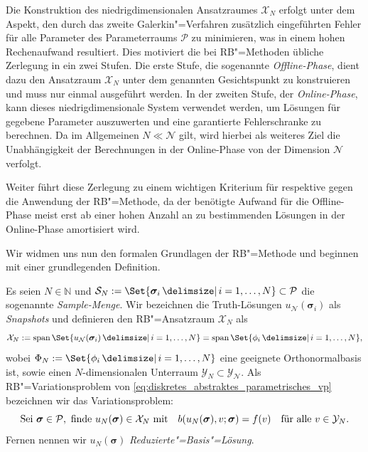 \documentclass[../main.tex]{subfiles}
\begin{document}
Die Konstruktion des niedrigdimensionalen Ansatzraumes $\mathcal X_{N}$ erfolgt unter dem Aspekt, den durch das zweite Galerkin"=Verfahren zusätzlich eingeführten Fehler für alle Parameter des Parameterraums $\mathcal P$ zu minimieren, was in einem hohen Rechenaufwand resultiert.
Dies motiviert die bei RB"=Methoden übliche Zerlegung in ein zwei Stufen.
Die erste Stufe, die sogenannte \emph{Offline-Phase}, dient dazu den Ansatzraum $\mathcal X_{N}$ unter dem genannten Gesichtspunkt zu konstruieren und muss nur einmal ausgeführt werden.
In der zweiten Stufe, der \emph{Online-Phase}, kann dieses niedrigdimensionale System verwendet werden, um Lösungen für gegebene Parameter auszuwerten und eine garantierte Fehlerschranke zu berechnen.
Da im Allgemeinen $N \ll \mathcal N$ gilt, wird hierbei als weiteres Ziel die Unabhängigkeit der Berechnungen in der Online-Phase von der Dimension $\mathcal N$ verfolgt.

Weiter führt diese Zerlegung zu einem wichtigen Kriterium für respektive gegen die Anwendung der RB"=Methode, da der benötigte Aufwand für die Offline-Phase meist erst ab einer hohen Anzahl an zu bestimmenden Lösungen in der Online-Phase amortisiert wird.

Wir widmen uns nun den formalen Grundlagen der RB"=Methode und beginnen mit einer grundlegenden Definition.

\begin{Definition}
\label{definition:rb_variationsproblem}
    Es seien $N \in \mathbb{N}$ und $\mathcal S_{N} := \Set{ \bm \sigma_{i} \given i = 1, \dots, N } \subset \mathcal P$ die sogenannte \emph{Sample-Menge}.
    Wir bezeichnen die Truth-Lösungen $u_{\mathcal N}(\bm \sigma_{i})$ als \emph{Snapshots} und definieren den RB"=Ansatzraum $\mathcal X_{N}$ als
    \begin{equation}
        \mathcal X_{N} := \spn \Set{ u_{\mathcal N}(\bm \sigma_{i}) \given i = 1, \dots, N} = \spn \Set{ \phi_{i} \given i = 1, \dots, N},
    \end{equation}
    wobei $\Phi_{N} := \Set{ \phi_{i} \given i = 1, \dots, N}$ eine geeignete Orthonormalbasis ist, sowie einen $N$-dimensionalen Unterraum  $\mathcal Y_{N} \subset \mathcal Y_{\mathcal N}$.
    Als RB"=Variationsproblem von \cref{eq:diskretes_abstraktes_parametrisches_vp} bezeichnen wir das  Variationsproblem:
    \begin{equation}
    \label{eq:rb_abstraktes_parametriches_vp}
        \text{Sei } \bm \sigma \in \mathcal P, \text{ finde } u_{N}(\bm \sigma) \in \mathcal X_{N} \text{ mit} \quad b(u_{N}(\bm \sigma), v; \bm \sigma) = f(v) \quad \fa v \in \mathcal Y_{N}.
    \end{equation}
    Fernen nennen wir $u_{N}(\bm \sigma)$ \emph{Reduzierte"=Basis"=Lösung}.
\end{Definition}
\end{document}
